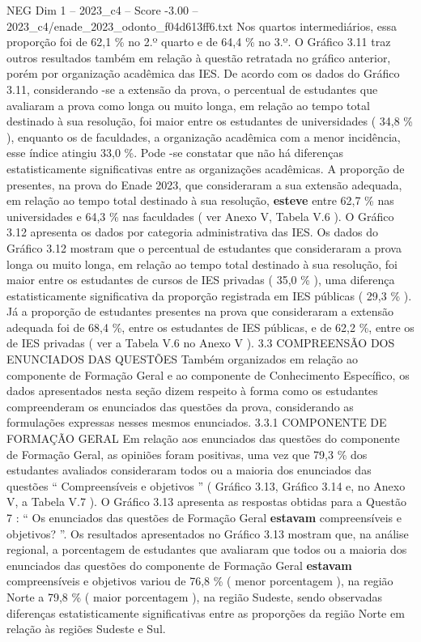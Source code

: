 \begin{textsample}{NEG Dim 1 – 2023\_c4 – Score -3.00 – 2023\_c4/enade\_2023\_odonto\_f04d613ff6.txt}
Nos quartos intermediários, essa proporção foi de 62,1 \% no 2.º quarto e de 64,4 \% no 3.º.
O Gráfico 3.11 traz outros resultados também em relação à questão retratada no gráfico anterior, porém por organização acadêmica das IES.
De acordo com os dados do Gráfico 3.11, considerando -se a extensão da prova, o percentual de estudantes que avaliaram a prova como longa ou muito longa, em relação ao tempo total destinado à sua resolução, foi maior entre os estudantes de universidades ( 34,8 \% ), enquanto os de faculdades, a organização acadêmica com a menor incidência, esse índice atingiu 33,0 \%.
Pode -se constatar que não há diferenças estatisticamente significativas entre as organizações acadêmicas.
A proporção de presentes, na prova do Enade 2023, que consideraram a sua extensão adequada, em relação ao tempo total destinado à sua resolução, \textbf{esteve} entre 62,7 \% nas universidades e 64,3 \% nas faculdades ( ver Anexo V, Tabela V.6 ).
O Gráfico 3.12 apresenta os dados por categoria administrativa das IES.
Os dados do Gráfico 3.12 mostram que o percentual de estudantes que consideraram a prova longa ou muito longa, em relação ao tempo total destinado à sua resolução, foi maior entre os estudantes de cursos de IES privadas ( 35,0 \% ), uma diferença estatisticamente significativa da proporção registrada em IES públicas ( 29,3 \% ).
Já a proporção de estudantes presentes na prova que consideraram a extensão adequada foi de 68,4 \%, entre os estudantes de IES públicas, e de 62,2 \%, entre os de IES privadas ( ver a Tabela V.6 no Anexo V ). 3.3 COMPREENSÃO DOS ENUNCIADOS DAS QUESTÕES Também organizados em relação ao componente de Formação Geral e ao componente de Conhecimento Específico, os dados apresentados nesta seção dizem respeito à forma como os estudantes compreenderam os enunciados das questões da prova, considerando as formulações expressas nesses mesmos enunciados. 3.3.1 COMPONENTE DE FORMAÇÃO GERAL Em relação aos enunciados das questões do componente de Formação Geral, as opiniões foram positivas, uma vez que 79,3 \% dos estudantes avaliados consideraram todos ou a maioria dos enunciados das questões “ Compreensíveis e objetivos ” ( Gráfico 3.13, Gráfico 3.14 e, no Anexo V, a Tabela V.7 ).
O Gráfico 3.13 apresenta as respostas obtidas para a Questão 7 : “ Os enunciados das questões de Formação Geral \textbf{estavam} compreensíveis e objetivos? ”.
Os resultados apresentados no Gráfico 3.13 mostram que, na análise regional, a porcentagem de estudantes que avaliaram que todos ou a maioria dos enunciados das questões do componente de Formação Geral \textbf{estavam} compreensíveis e objetivos variou de 76,8 \% ( menor porcentagem ), na região Norte a 79,8 \% ( maior porcentagem ), na região Sudeste, sendo observadas diferenças estatisticamente significativas entre as proporções da região Norte em relação às regiões Sudeste e Sul.

\end{textsample}
